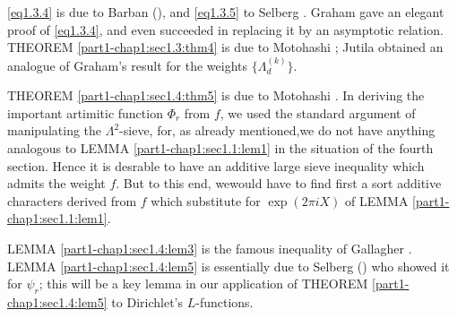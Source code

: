 \eqref{eq1.3.4} is due to Barban (\cite{key2}), and
\eqref{eq1.3.5} to Selberg 
\cite{key69}. Graham \cite{key19} gave an elegant proof of
\eqref{eq1.3.4}, and even 
succeeded in replacing it by an asymptotic relation. THEOREM
\ref{part1-chap1:sec1.3:thm4} is 
due to Motohashi \cite{key58}; Jutila \cite{key41} obtained an analogue of
Graham's result for the weights $\{\Lambda_d^{(k)}\}$.  

THEOREM \ref{part1-chap1:sec1.4:thm5} is due to Motohashi \cite{key58}. In
deriving the important 
artimitic function $\Phi_r$ from $f$, we used the standard argument of
manipulating the $\Lambda^2$-sieve, for, as already mentioned,we do
not have anything analogous to LEMMA \ref{part1-chap1:sec1.1:lem1}
in the situation of the 
fourth section. Hence it is desrable to have an additive large sieve
inequality which  admits the weight $f$. But to this end, we\pageoriginale would
have to find first a sort additive characters derived from $f$ which
substitute for $\exp (2 \pi i X)$ of LEMMA \ref{part1-chap1:sec1.1:lem1}.   

LEMMA \ref{part1-chap1:sec1.4:lem3} is the famous inequality of
Gallagher \cite{key15}. LEMMA \ref{part1-chap1:sec1.4:lem5} is 
essentially due to Selberg (\cite{key50}) who showed it for $\psi_r$; this
will be a key lemma in our application of THEOREM
\ref{part1-chap1:sec1.4:lem5} to Dirichlet's 
$L$-functions. 
